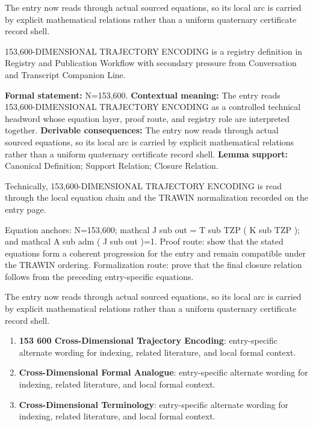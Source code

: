 The entry now reads through actual sourced equations, so its local arc is carried by explicit mathematical relations rather than a uniform quaternary certificate record shell.
\clearpage


\begingroup\small
{}
153,600-DIMENSIONAL TRAJECTORY ENCODING is a registry definition in Registry and Publication Workflow with secondary pressure from Conversation and Transcript Companion Line.

\begingroup\footnotesize\setlength{\emergencystretch}{3em}\sloppy
\textbf{Formal statement:} N=153,600. \textbf{Contextual meaning:} The entry reads 153,600-DIMENSIONAL TRAJECTORY ENCODING as a controlled technical headword whose equation layer, proof route, and registry role are interpreted together. \textbf{Derivable consequences:} The entry now reads through actual sourced equations, so its local arc is carried by explicit mathematical relations rather than a uniform quaternary certificate record shell. \textbf{Lemma support:} Canonical Definition; Support Relation; Closure Relation.\par
\endgroup

Technically, 153,600-DIMENSIONAL TRAJECTORY ENCODING is read through the local equation chain and the TRAWIN normalization recorded on the entry page.

Equation anchors: N=153,600; mathcal J sub out = T sub TZP ( K sub TZP ); and mathcal A sub adm ( J sub out )=1. Proof route: show that the stated equations form a coherent progression for the entry and remain compatible under the TRAWIN ordering. Formalization route: prove that the final closure relation follows from the preceding entry-specific equations.

The entry now reads through actual sourced equations, so its local arc is carried by explicit mathematical relations rather than a uniform quaternary certificate record shell.
\endgroup

\begin{enumerate}[leftmargin=1.6em,itemsep=6pt,topsep=4pt]
\item \textbf{153 600 Cross-Dimensional Trajectory Encoding}: entry-specific alternate wording for indexing, related literature, and local formal context.
\item \textbf{Cross-Dimensional Formal Analogue}: entry-specific alternate wording for indexing, related literature, and local formal context.
\item \textbf{Cross-Dimensional Terminology}: entry-specific alternate wording for indexing, related literature, and local formal context.
\end{enumerate}

